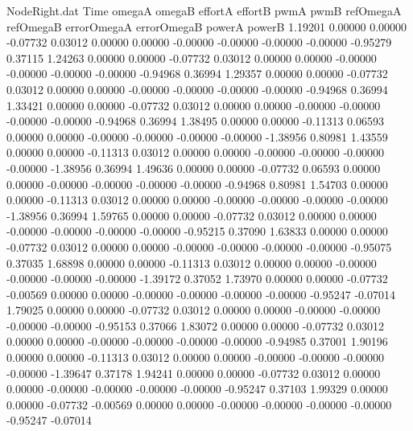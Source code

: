 \begin{filecontents}{NodeRight.dat}
Time omegaA omegaB effortA effortB pwmA pwmB refOmegaA refOmegaB errorOmegaA errorOmegaB powerA powerB
   1.19201    0.00000    0.00000    -0.07732    0.03012    0.00000    0.00000   -0.00000   -0.00000   -0.00000   -0.00000   -0.95279    0.37115
   1.24263    0.00000    0.00000    -0.07732    0.03012    0.00000    0.00000   -0.00000   -0.00000   -0.00000   -0.00000   -0.94968    0.36994
   1.29357    0.00000    0.00000    -0.07732    0.03012    0.00000    0.00000   -0.00000   -0.00000   -0.00000   -0.00000   -0.94968    0.36994
   1.33421    0.00000    0.00000    -0.07732    0.03012    0.00000    0.00000   -0.00000   -0.00000   -0.00000   -0.00000   -0.94968    0.36994
   1.38495    0.00000    0.00000    -0.11313    0.06593    0.00000    0.00000   -0.00000   -0.00000   -0.00000   -0.00000   -1.38956    0.80981
   1.43559    0.00000    0.00000    -0.11313    0.03012    0.00000    0.00000   -0.00000   -0.00000   -0.00000   -0.00000   -1.38956    0.36994
   1.49636    0.00000    0.00000    -0.07732    0.06593    0.00000    0.00000   -0.00000   -0.00000   -0.00000   -0.00000   -0.94968    0.80981
   1.54703    0.00000    0.00000    -0.11313    0.03012    0.00000    0.00000   -0.00000   -0.00000   -0.00000   -0.00000   -1.38956    0.36994
   1.59765    0.00000    0.00000    -0.07732    0.03012    0.00000    0.00000   -0.00000   -0.00000   -0.00000   -0.00000   -0.95215    0.37090
   1.63833    0.00000    0.00000    -0.07732    0.03012    0.00000    0.00000   -0.00000   -0.00000   -0.00000   -0.00000   -0.95075    0.37035
   1.68898    0.00000    0.00000    -0.11313    0.03012    0.00000    0.00000   -0.00000   -0.00000   -0.00000   -0.00000   -1.39172    0.37052
   1.73970    0.00000    0.00000    -0.07732   -0.00569    0.00000    0.00000   -0.00000   -0.00000   -0.00000   -0.00000   -0.95247   -0.07014
   1.79025    0.00000    0.00000    -0.07732    0.03012    0.00000    0.00000   -0.00000   -0.00000   -0.00000   -0.00000   -0.95153    0.37066
   1.83072    0.00000    0.00000    -0.07732    0.03012    0.00000    0.00000   -0.00000   -0.00000   -0.00000   -0.00000   -0.94985    0.37001
   1.90196    0.00000    0.00000    -0.11313    0.03012    0.00000    0.00000   -0.00000   -0.00000   -0.00000   -0.00000   -1.39647    0.37178
   1.94241    0.00000    0.00000    -0.07732    0.03012    0.00000    0.00000   -0.00000   -0.00000   -0.00000   -0.00000   -0.95247    0.37103
   1.99329    0.00000    0.00000    -0.07732   -0.00569    0.00000    0.00000   -0.00000   -0.00000   -0.00000   -0.00000   -0.95247   -0.07014

\end{filecontents}
